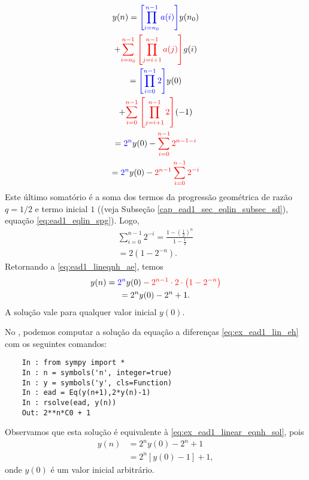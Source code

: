 \begin{ex}
\begin{enumerate}
    \begin{gather}
      y(n) = {\color{blue}\left[\prod_{i=n_0}^{n-1} a(i)\right]}y(n_0) \\
      + {\color{red}\sum_{i=n_0}^{n-1}\left[\prod_{j=i+1}^{n-1} a(j)\right]}g(i) \\
      = {\color{blue}\left[\prod_{i=0}^{n-1} 2\right]}y(0) \\
      + {\color{red}\sum_{i=0}^{n-1}\left[\prod_{j=i+1}^{n-1} 2\right]}(-1) \\
      = {\color{blue}2^n}y(0) -{\color{red} \sum_{i=0}^{n-1}2^{n-1-i}}\\
      = {\color{blue}2^n}y(0) - {\color{red}2^{n-1}\sum_{i=0}^{n-1}2^{-i}}\label{eq:ead1_lineqnh_ae}
    \end{gather}
    Este último somatório é a soma dos termos da progressão geométrica de razão $q=1/2$ e termo inicial $1$ ((veja Subseção \ref{cap_ead1_sec_eqlin_subsec_sd}), equação \eqref{eq:ead1_eqlin_spg}). Logo,
    \begin{gather}
      \sum_{i=0}^{n-1}2^{-i} = \frac{1-\left(\frac{1}{2}\right)^n}{1-\frac{1}{2}}\\
      = 2\left(1-2^{-n}\right).
    \end{gather}
    Retornando a \eqref{eq:ead1_lineqnh_ae}, temos
    \begin{gather}
      y(n) = {\color{blue}2^n}y(0) - {\color{red}2^{n-1}\cdot 2\cdot \left(1 - 2^{-n}\right)}\\
      = 2^ny(0) - 2^{n} + 1. \label{eq:ex_ead1_linear_eqnh_sol}
    \end{gather}
    A solução vale para qualquer valor inicial $y(0)$.
  \end{enumerate}
  \ifispython
  No \python, podemos computar a solução da equação a diferenças \eqref{eq:ex_ead1_lin_eh} com os seguintes comandos:
  \begin{lstlisting}
    In : from sympy import *
    In : n = symbols('n', integer=true)
    In : y = symbols('y', cls=Function)
    In : ead = Eq(y(n+1),2*y(n)-1)
    In : rsolve(ead, y(n))
    Out: 2**n*C0 + 1
  \end{lstlisting}
  Observamos que esta solução é equivalente à \eqref{eq:ex_ead1_linear_eqnh_sol}, pois
  \begin{align}
    y(n) &= 2^ny(0) - 2^{n} + 1 \\
    &= 2^n\left[y(0)-1\right]+1,
  \end{align}
  onde $y(0)$ é um valor inicial arbitrário.
  \fi
\end{ex}

